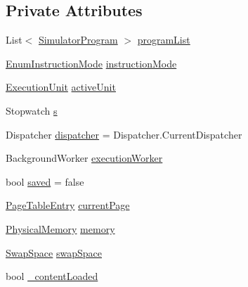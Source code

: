 \subsection*{Private Attributes}
\begin{DoxyCompactItemize}
\item 
List$<$ \hyperlink{class_c_p_u___o_s___simulator_1_1_c_p_u_1_1_simulator_program}{Simulator\+Program} $>$ \hyperlink{class_c_p_u___o_s___simulator_1_1_main_window_a48fa4dc074c098338a652dbd6a3434c7}{program\+List}
\item 
\hyperlink{namespace_c_p_u___o_s___simulator_adc17a5a5e004084f05dc8e4d3f70e31f}{Enum\+Instruction\+Mode} \hyperlink{class_c_p_u___o_s___simulator_1_1_main_window_adcf36837be53f52843bbeb354a16d15c}{instruction\+Mode}
\item 
\hyperlink{class_c_p_u___o_s___simulator_1_1_c_p_u_1_1_execution_unit}{Execution\+Unit} \hyperlink{class_c_p_u___o_s___simulator_1_1_main_window_af00ce05444d9636c688974f706ef397b}{active\+Unit}
\item 
Stopwatch \hyperlink{class_c_p_u___o_s___simulator_1_1_main_window_a880dc01f7c4f093b77ace064d93be1f3}{s}
\item 
Dispatcher \hyperlink{class_c_p_u___o_s___simulator_1_1_main_window_a5115439e688bb7ed25f5237b266e4f3f}{dispatcher} = Dispatcher.\+Current\+Dispatcher
\item 
Background\+Worker \hyperlink{class_c_p_u___o_s___simulator_1_1_main_window_a80e0a87480e4b7f4cfdb47739985b7c7}{execution\+Worker}
\item 
bool \hyperlink{class_c_p_u___o_s___simulator_1_1_main_window_afcd7446d65f9b9370ddf07499c2b8113}{saved} = false
\item 
\hyperlink{class_c_p_u___o_s___simulator_1_1_memory_1_1_page_table_entry}{Page\+Table\+Entry} \hyperlink{class_c_p_u___o_s___simulator_1_1_main_window_a14f6732faabdb632f3d29dbcbbb7059d}{current\+Page}
\item 
\hyperlink{class_c_p_u___o_s___simulator_1_1_memory_1_1_physical_memory}{Physical\+Memory} \hyperlink{class_c_p_u___o_s___simulator_1_1_main_window_a39a29cd60cb4ccbad0415a4e6d6414fa}{memory}
\item 
\hyperlink{class_c_p_u___o_s___simulator_1_1_memory_1_1_swap_space}{Swap\+Space} \hyperlink{class_c_p_u___o_s___simulator_1_1_main_window_ab9638abdc8d65670240a036bc02d813c}{swap\+Space}
\item 
bool \hyperlink{class_c_p_u___o_s___simulator_1_1_main_window_ae8269f86a68d5fdf06180686fc947cc6}{\+\_\+content\+Loaded}
\end{DoxyCompactItemize}


